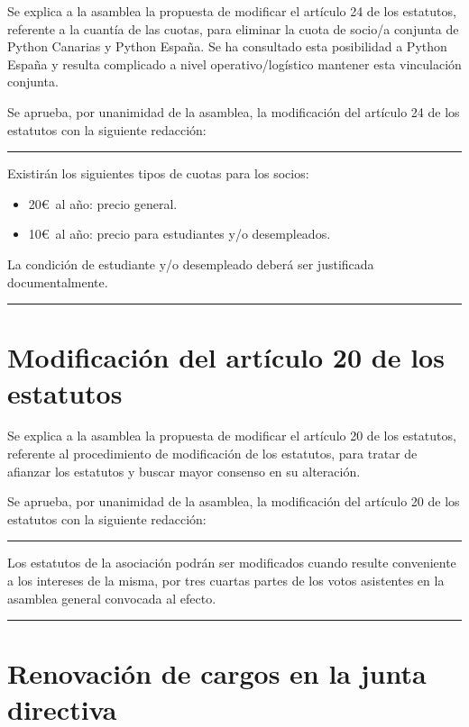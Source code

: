 \documentclass[a4paper, 12pt]{article}
\begin{document}
Se explica a la asamblea la propuesta de modificar el artículo 24 de los estatutos, referente a la cuantía de las cuotas, para eliminar la cuota de socio/a conjunta de Python Canarias y Python España. Se ha consultado esta posibilidad a Python España y resulta complicado a nivel operativo/logístico mantener esta vinculación conjunta.

Se aprueba, por unanimidad de la asamblea, la modificación del artículo 24 de los estatutos con la siguiente redacción:\\

\hrule
\vspace{3mm}

Existirán los siguientes tipos de cuotas para los socios:

\begin{itemize}
    \item 20\euro\ al año: precio general.
    \item 10\euro\ al año: precio para estudiantes y/o desempleados.
\end{itemize}

La condición de estudiante y/o desempleado deberá ser justificada documentalmente.

\vspace{3mm}
\hrule

\section{Modificación del artículo 20 de los estatutos}

Se explica a la asamblea la propuesta de modificar el artículo 20 de los estatutos, referente al procedimiento de modificación de los estatutos, para tratar de afianzar los estatutos y buscar mayor consenso en su alteración.

Se aprueba, por unanimidad de la asamblea, la modificación del artículo 20 de los estatutos con la siguiente redacción:\\

\hrule
\vspace{3mm}

Los estatutos de la asociación podrán ser modificados cuando resulte conveniente a los intereses de la misma, por tres cuartas partes de los votos asistentes en la asamblea general convocada al efecto.

\vspace{3mm}
\hrule

\section{Renovación de cargos en la junta directiva}
\end{document}
